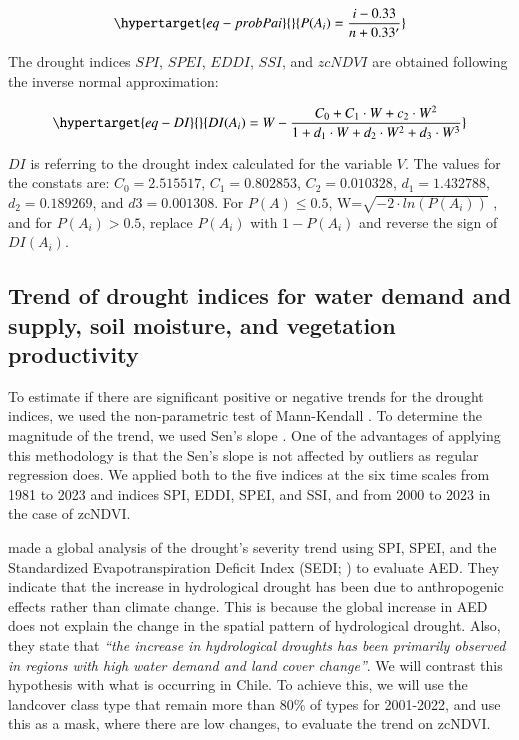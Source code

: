 \documentclass[
  number,
  preprint,
  3p,
  onecolumn]{elsarticle}
\begin{document}
\begin{equation}\protect\hypertarget{eq-probPai}{}{P(A_i) = \frac{i-0.33}{n+0.33'}}\label{eq-probPai}\end{equation}

The drought indices \(SPI\), \(SPEI\), \(EDDI\), \(SSI\), and \(zcNDVI\)
are obtained following the inverse normal approximation:

\begin{equation}\protect\hypertarget{eq-DI}{}{DI(A_i) = W - \frac{C_0+C_1\cdot W + c_2 \cdot W^2}{1+d_1\cdot W +d_2\cdot W^2 +d_3\cdot W^3}}\label{eq-DI}\end{equation}

\(DI\) is referring to the drought index calculated for the variable
\(V\). The values for the constats are: \(C_0 = 2.515517\),
\(C_1 = 0.802853\), \(C_2 = 0.010328\), \(d_1 = 1.432788\),
\(d_2 = 0.189269\), and \(d3 = 0.001308\). For \(P(A) \leq 0.5\),
W=\(\sqrt{-2\cdot ln(P(A_i))}\) , and for \(P(A_i) > 0.5\), replace
\(P(A_i)\) with \(1-P(A_i)\) and reverse the sign of \(DI(A_i)\).

\hypertarget{trend-of-drought-indices-for-water-demand-and-supply-soil-moisture-and-vegetation-productivity}{%
\subsection{Trend of drought indices for water demand and supply, soil
moisture, and vegetation
productivity}\label{trend-of-drought-indices-for-water-demand-and-supply-soil-moisture-and-vegetation-productivity}}

To estimate if there are significant positive or negative trends for the
drought indices, we used the non-parametric test of Mann-Kendall
\citep{Kendall1975}. To determine the magnitude of the trend, we used
Sen's slope \citep{Sen1968}. One of the advantages of applying this
methodology is that the Sen's slope is not affected by outliers as
regular regression does. We applied both to the five indices at the six
time scales from 1981 to 2023 and indices SPI, EDDI, SPEI, and SSI, and
from 2000 to 2023 in the case of zcNDVI.

\citep{Vicente-Serrano2021} made a global analysis of the drought's
severity trend using SPI, SPEI, and the Standardized Evapotranspiration
Deficit Index (SEDI; \citep{Vicente-Serrano2018}) to evaluate AED. They
indicate that the increase in hydrological drought has been due to
anthropogenic effects rather than climate change. This is because the
global increase in AED does not explain the change in the spatial
pattern of hydrological drought. Also, they state that \emph{``the
increase in hydrological droughts has been primarily observed in regions
with high water demand and land cover change''}. We will contrast this
hypothesis with what is occurring in Chile. To achieve this, we will use
the landcover class type that remain more than 80\% of types for
2001-2022, and use this as a mask, where there are low changes, to
evaluate the trend on zcNDVI.
\end{document}
